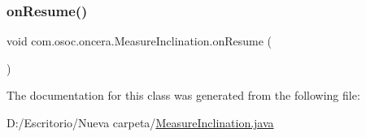 \mbox{\label{classcom_1_1osoc_1_1oncera_1_1_measure_inclination_a952bcfc81db2b66b95e255abe8c87224}} 
\subsubsection{\texorpdfstring{onResume()}{onResume()}}
{\footnotesize\ttfamily void com.\+osoc.\+oncera.\+Measure\+Inclination.\+on\+Resume (\begin{DoxyParamCaption}{ }\end{DoxyParamCaption})\hspace{0.3cm}{\ttfamily [protected]}}



The documentation for this class was generated from the following file\+:\begin{DoxyCompactItemize}
\item 
D\+:/\+Escritorio/\+Nueva carpeta/\mbox{\hyperlink{_measure_inclination_8java}{Measure\+Inclination.\+java}}\end{DoxyCompactItemize}
